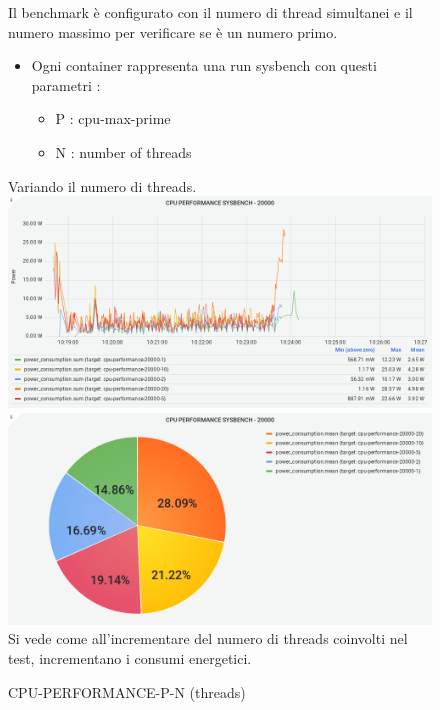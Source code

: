 \documentclass[10pt,a4paper]{article}
\begin{document}
\begin{figure}[h]
\caption{CPU-PERFORMANCE-P-N (threads)}
Il benchmark è configurato con il numero di thread simultanei e il numero massimo per verificare se è un numero primo.
\begin{flushleft}
\begin{itemize}
\item Ogni container rappresenta una run sysbench con questi parametri :
\begin{itemize}
\item P : cpu-max-prime
\item N : number of threads
\end{itemize}
\end{itemize}
Variando il numero di threads. 
\includegraphics[scale=0.4]{image10}
\includegraphics[scale=0.4]{image38}
\\ Si vede come all'incrementare del numero di threads coinvolti nel test, incrementano i consumi energetici.
\end{flushleft}
\end{figure}
\end{document}
